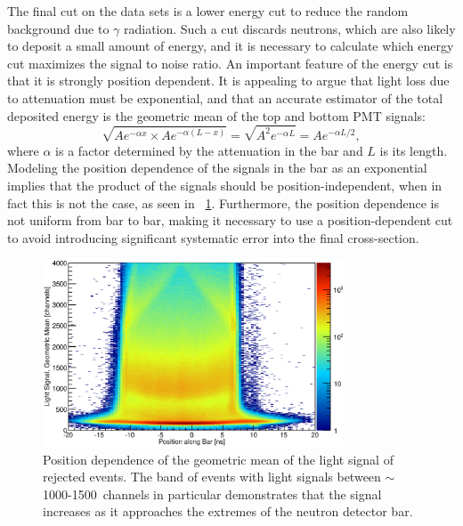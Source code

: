 The final cut on the data sets is a lower energy cut to reduce the random background due to $\gamma$ radiation.  Such a cut discards neutrons, which are also likely to deposit a small amount of energy, and it is necessary to calculate which energy cut maximizes the signal to noise ratio.  An important feature of the energy cut is that it is strongly position dependent.  It is appealing to argue that light loss due to attenuation must be exponential, and that an accurate estimator of the total deposited energy is the geometric mean of the top and bottom PMT signals:
\begin{equation}
\sqrt{Ae^{-\alpha x}\times Ae^{-\alpha (L-x)}} = \sqrt{A^2e^{-\alpha L}} = Ae^{-\alpha L/2},
\end{equation}
where $\alpha$ is a factor determined by the attenuation in the bar and $L$ is its length.  Modeling the position dependence of the signals in the bar as an exponential implies that the product of the signals should be position-independent, when in fact this is not the case, as seen in {\fig}~\ref{fig:product_positionDependence}.  Furthermore, the position dependence is not uniform from bar to bar, making it necessary to use a position-dependent cut to avoid introducing significant systematic error into the final cross-section.
\begin{figure}[!htbp]
\centering
\includegraphics[width=0.8\textwidth]{figures/positionVSenergy.eps}
\caption{Position dependence of the geometric mean of the light signal of rejected events.  The band of events with light signals between $\sim$1000-1500~channels in particular demonstrates that the signal increases as it approaches the extremes of the neutron detector bar.}
\label{fig:product_positionDependence}
\end{figure}


